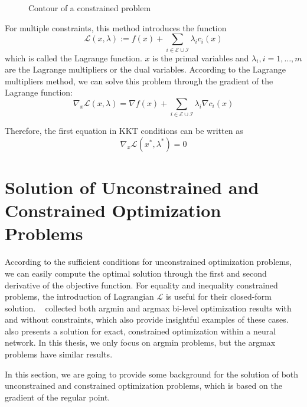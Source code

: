 \begin{figure}[t]
    \caption{Contour of a constrained problem}
\end{figure}

For multiple constraints, this method introduces the function 
$$
\mathscr{L}(x, \lambda):=f(x)+\sum_{i \in \mathscr{E} \cup \mathscr{I}} \lambda_{i} c_{i}(x)
$$
which is called the Lagrange function. $x$ is the primal variables and $\lambda_i, i=1, \dots, m$ are the Lagrange multipliers or the dual variables. According to the Lagrange multipliers method, we can solve this problem through the gradient of the Lagrange function: 
$$
\nabla_{x} \mathscr{L}(x, \lambda)=\nabla f(x)+\sum_{i \in \mathscr{E} \cup \mathscr{I}} \lambda_{i} \nabla c_{i}(x)
$$
\par Therefore, the first equation in KKT conditions can be written as
$$
\nabla_{x} \mathscr{L}\left(x^{*}, \lambda^{*}\right)=0
$$

\section{Solution of Unconstrained and Constrained Optimization Problems}
\label{sec:consopt}
According to the sufficient conditions for unconstrained optimization problems, we can easily compute the optimal solution through the first and second derivative of the objective function. For equality and inequality constrained problems, the introduction of Lagrangian $\mathcal{L}$ is useful for their closed-form solution. ~\cite{SG:16} collected both argmin and argmax bi-level optimization results with and without constraints, which also provide insightful examples of these cases. ~\cite{AB:17} also presents a solution for exact, constrained optimization within a neural network. In this thesis, we only focus on argmin problems, but the argmax problems have similar results. 
\par In this section, we are going to provide some background for the solution of both unconstrained and constrained optimization problems, which is based on the gradient of the regular point. 
